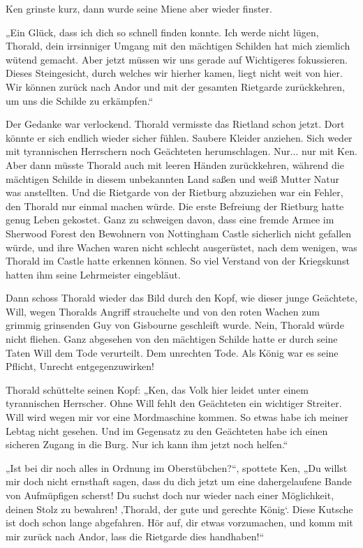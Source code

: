 \documentclass[10pt, a4paper, oneside]{book}
\begin{document}
Ken grinste kurz, dann wurde seine Miene aber wieder finster.

„Ein Glück, dass ich dich so schnell finden konnte. Ich werde nicht lügen, Thorald, dein irrsinniger Umgang mit den mächtigen Schilden hat mich ziemlich wütend gemacht. Aber jetzt müssen wir uns gerade auf Wichtigeres fokussieren. Dieses Steingesicht, durch welches wir hierher kamen, liegt nicht weit von hier. Wir können zurück nach Andor und mit der gesamten Rietgarde zurückkehren, um uns die Schilde zu erkämpfen.“

Der Gedanke war verlockend. Thorald vermisste das Rietland schon jetzt. Dort könnte er sich endlich wieder sicher fühlen. Saubere Kleider anziehen. Sich weder mit tyrannischen Herrschern noch Geächteten herumschlagen. Nur... nur mit Ken. Aber dann müsste Thorald auch mit leeren Händen zurückkehren, während die mächtigen Schilde in diesem unbekannten Land saßen und weiß Mutter Natur was anstellten. Und die Rietgarde von der Rietburg abzuziehen war ein Fehler, den Thorald nur einmal machen würde. Die erste Befreiung der Rietburg hatte genug Leben gekostet. Ganz zu schweigen davon, dass eine fremde Armee im Sherwood Forest den Bewohnern von Nottingham Castle sicherlich nicht gefallen würde, und ihre Wachen waren nicht schlecht ausgerüstet, nach dem wenigen, was Thorald im Castle hatte erkennen können. So viel Verstand von der Kriegskunst hatten ihm seine Lehrmeister eingebläut.

Dann schoss Thorald wieder das Bild durch den Kopf, wie dieser junge Geächtete, Will, wegen Thoralds Angriff strauchelte und von den roten Wachen zum grimmig grinsenden Guy von Gisbourne geschleift wurde. Nein, Thorald würde nicht fliehen. Ganz abgesehen von den mächtigen Schilde hatte er durch seine Taten Will dem Tode verurteilt. Dem unrechten Tode. Als König war es seine Pflicht, Unrecht entgegenzuwirken!

Thorald schüttelte seinen Kopf: „Ken, das Volk hier leidet unter einem tyrannischen Herrscher. Ohne Will fehlt den Geächteten ein wichtiger Streiter. Will wird wegen mir vor eine Mordmaschine kommen. So etwas habe ich meiner Lebtag nicht gesehen. Und im Gegensatz zu den Geächteten habe ich einen sicheren Zugang in die Burg. Nur ich kann ihm jetzt noch helfen.“

„Ist bei dir noch alles in Ordnung im Oberstübchen?“, spottete Ken, „Du willst mir doch nicht ernsthaft sagen, dass du dich jetzt um eine dahergelaufene Bande von Aufmüpfigen scherst! Du suchst doch nur wieder nach einer Möglichkeit, deinen Stolz zu bewahren! ‚Thorald, der gute und gerechte König‘. Diese Kutsche ist doch schon lange abgefahren. Hör auf, dir etwas vorzumachen, und komm mit mir zurück nach Andor, lass die Rietgarde dies handhaben!“
\end{document}
